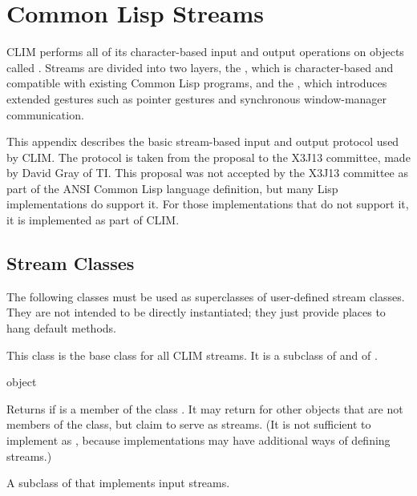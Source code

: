 
\chapter {Common Lisp Streams}
\label {gray-streams}

CLIM performs all of its character-based input and output operations on objects
called .  Streams are divided into two layers, the
, which is character-based and compatible with
existing Common Lisp programs, and the , which
introduces extended gestures such as pointer gestures and synchronous
window-manager communication.

This appendix describes the basic stream-based input and output protocol used by
CLIM.  The protocol is taken from the  proposal to
the X3J13 committee, made by David Gray of TI.  This proposal was not accepted
by the X3J13 committee as part of the ANSI Common Lisp language definition, but
many Lisp implementations do support it.   For those implementations that do not
support it, it is implemented as part of CLIM.


\section {Stream Classes}

The following classes must be used as superclasses of user-defined stream
classes.  They are not intended to be directly instantiated; they just provide
places to hang default methods.



This class is the base class for all CLIM streams.  It is a subclass of
 and of .

 {object}

Returns  if  is a member of the class
.  It may return  for other objects that are
not members of the  class, but claim to serve as streams.
(It is not sufficient to implement  as , because implementations may have additional ways of
defining streams.)



A subclass of  that implements input streams.

